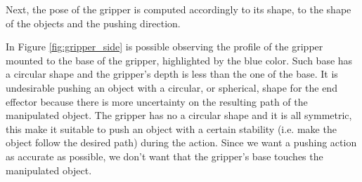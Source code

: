 Next, the pose of the gripper is computed accordingly to its shape, to the shape of the objects and the pushing direction.


In Figure \ref{fig:gripper_side}
is possible observing the profile of the gripper mounted to the base of the gripper, highlighted by the blue color. Such base has a circular shape and the gripper's depth is less than the one of the base. It is undesirable pushing an object with a circular, or spherical, shape for the end effector because there is more uncertainty on the resulting path of the manipulated object. The gripper has no a circular shape and it is all symmetric, this make it suitable to push an object with a certain stability (i.e. make the object follow the desired path) during the action. Since we want a pushing action as accurate as possible, we don't want that the gripper's base touches the manipulated object. 

